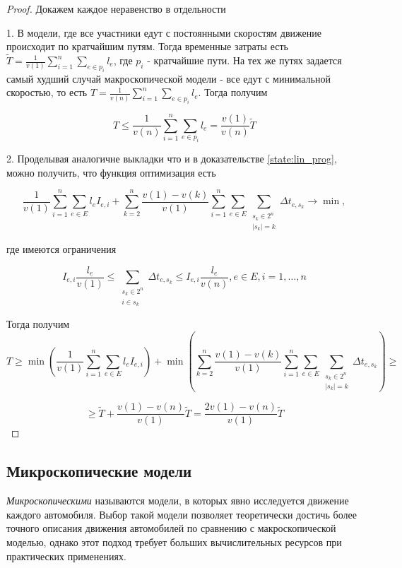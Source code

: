\documentclass[12pt, a4paper]{article}
\DeclareMathOperator*{\minn}{min}
\begin{document}
\begin{proof}
	Докажем каждое неравенство в отдельности
	
	1. В модели, где все участники едут с постоянными скоростям движение происходит по кратчайшим путям. Тогда временные затраты есть $\widetilde{T} = \frac{1}{v(1)} \sum \limits _{i = 1} ^ n \sum\limits_{e \in p_i} l_e$, где $p_i$ - кратчайшие пути.
	На тех же путях задается самый худший случай макроскопической модели - все едут с минимальной скоростью, то есть $ T = \frac{1}{v(n)} \sum \limits _{i = 1} ^ n \sum\limits_{e \in p_i} l_e$. Тогда получим
	
	$$T \le  \frac{1}{v(n)} \sum \limits _{i = 1} ^ n \sum\limits_{e \in p_i} l_e = \frac {v(1)}{v(n)} \widetilde{T}$$
	
	2. Проделывая аналогичне выкладки что и в доказательстве \ref{state:lin_prog}, можно получить, что функция оптимизация есть 
	
	$$ \frac{1}{v (1)} \sum\limits_{i = 1}^n \sum \limits _{e \in E} l_e I_{e, i} +  \sum\limits_{k = 2}^{n} \frac{v(1) - v(k)}{v (1)}  \sum\limits_{i = 1}^n \sum \limits _{e \in E} \sum\limits _{\substack{ s_k \in 2^n \\ |s_k| = k}}  \Delta t_{e, s_k} \rightarrow \minn ,$$
	
	где имеются ограничения
    
    $$I_{e, i} \frac{l_e}{v(1)} \le  \sum\limits _{\substack{ s_k \in 2^n \\ i \in s_k}}  \Delta t_{e, s_k} \le I_{e, i} \frac{l_e}{v(n)} , e \in E,  i = 1, \dots, n$$
	
	Тогда получим
		$$T \ge 
		  \minn \left(  \frac{1}{v (1)} \sum\limits_{i = 1}^n \sum \limits _{e \in E} l_e I_{e, i} \right) 
		+ \minn \left(  \sum\limits_{k = 2}^{n} \frac{v(1) - v(k)}{v (1)}  \sum\limits_{i = 1}^n \sum \limits _{e \in E} \sum\limits _{\substack{ s_k \in 2^n \\ |s_k| = k}}  \Delta t_{e, s_k} \right) \ge $$
		
		$$\ge \widetilde{T} + \frac{v(1) - v(n)}{v(1)} \widetilde{T} =  \frac{2 v(1) - v(n)}{v(1)} \widetilde{T} $$

\end{proof}

\subsection*{Микроскопические модели}
\textit {Микроскопическими} называются модели, в которых явно исследуется движение каждого автомобиля.
Выбор такой модели позволяет теоретически достичь более точного описания движения автомобилей по сравнению с макроскопической моделью, однако этот подход требует больших вычислительных ресурсов при практических применениях.
\end{document}
